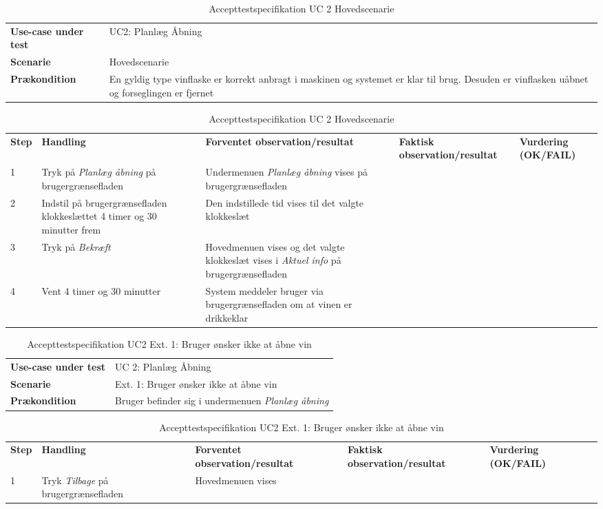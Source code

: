 \begin{table}[H]
	\centering
	\caption{Accepttestspecifikation UC 2 Hovedscenarie}
	\label{ATUC2:Hovedscenarie}
	\begin{tabular}{ p{80pt}  p{320pt} }\hline
		\rowcolor{lightgray}	
		\textbf{Use-case under test} & UC2: Planlæg Åbning \\
		\rowcolor{white}
		\textbf{Scenarie} & Hovedscenarie \\\rowcolor{lightgray}	
		\textbf{Prækondition} &
		En gyldig type vinflaske er korrekt anbragt i maskinen og systemet er klar til brug. Desuden er vinflasken uåbnet og forseglingen er fjernet \\
		\hline
	\end{tabular}
	\begin{tabular}{  p{26pt} p{100pt}  p{101pt} | p{67pt} | p{68pt}}
		\textbf{Step} & \textbf{Handling} & \textbf{Forventet observation/resultat} & \textbf{Faktisk observation/resultat} & \textbf{Vurdering (OK/FAIL)}\\
		1 & Tryk på \emph{Planlæg åbning} på brugergrænsefladen & Undermenuen \emph{Planlæg åbning} vises på brugergrænsefladen &  &  \\
		2 & Indstil på brugergrænsefladen klokkeslættet 4 timer og 30 minutter frem & Den indstillede tid vises til det valgte klokkeslæt &  &  \\
		3 & Tryk på \emph{Bekræft} & Hovedmenuen vises og det valgte klokkeslæt vises i \emph{Aktuel info} på brugergrænsefladen &  &  \\
		4 & Vent 4 timer og 30 minutter & System meddeler bruger via brugergrænsefladen om at vinen er drikkeklar &  &  \\
		\hline
	\end{tabular}
\end{table}

\begin{table}[H]
	\centering
	\caption{Accepttestspecifikation UC2 Ext. 1: Bruger ønsker ikke at åbne vin}
	\label{ATUC2:Ext1}
	\begin{tabular}{ p{80pt}  p{320pt} }\hline
		\rowcolor{lightgray}	
		\textbf{Use-case under test} & UC 2: Planlæg Åbning \\
		\rowcolor{white}
		\textbf{Scenarie} & Ext. 1: Bruger ønsker ikke at åbne vin \\\rowcolor{lightgray}	
		\textbf{Prækondition} &
		Bruger befinder sig i undermenuen \emph{Planlæg åbning} \\
		\hline
	\end{tabular}
	\begin{tabular}{  p{26pt} p{100pt}  p{101pt} | p{67pt} | p{68pt}}
		\textbf{Step} & \textbf{Handling} & \textbf{Forventet observation/resultat} & \textbf{Faktisk observation/resultat} & \textbf{Vurdering (OK/FAIL)}\\
		1 & Tryk \emph{Tilbage} på brugergrænsefladen & Hovedmenuen vises
 &  &  \\
		\hline
	\end{tabular}
\end{table}

